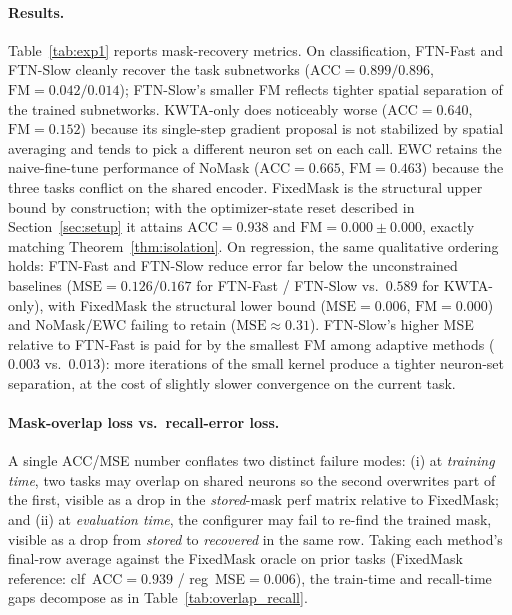 \documentclass{article}
\begin{document}
\paragraph{Results.}
Table~\ref{tab:exp1} reports mask-recovery metrics. On classification, FTN-Fast and FTN-Slow cleanly recover the task subnetworks ($\mathrm{ACC}{=}0.899 / 0.896$, $\mathrm{FM}{=}0.042 / 0.014$); FTN-Slow's smaller FM reflects tighter spatial separation of the trained subnetworks. KWTA-only does noticeably worse ($\mathrm{ACC}{=}0.640$, $\mathrm{FM}{=}0.152$) because its single-step gradient proposal is not stabilized by spatial averaging and tends to pick a different neuron set on each call. EWC retains the naive-fine-tune performance of NoMask ($\mathrm{ACC}{=}0.665$, $\mathrm{FM}{=}0.463$) because the three tasks conflict on the shared encoder. FixedMask is the structural upper bound by construction; with the optimizer-state reset described in Section~\ref{sec:setup} it attains $\mathrm{ACC}{=}0.938$ and $\mathrm{FM}{=}0.000\pm0.000$, exactly matching Theorem~\ref{thm:isolation}. On regression, the same qualitative ordering holds: FTN-Fast and FTN-Slow reduce error far below the unconstrained baselines ($\mathrm{MSE}{=}0.126 / 0.167$ for FTN-Fast / FTN-Slow vs.\ $0.589$ for KWTA-only), with FixedMask the structural lower bound ($\mathrm{MSE}{=}0.006$, $\mathrm{FM}{=}0.000$) and NoMask/EWC failing to retain ($\mathrm{MSE}{\approx}0.31$). FTN-Slow's higher MSE relative to FTN-Fast is paid for by the smallest FM among adaptive methods ($0.003$ vs.\ $0.013$): more iterations of the small kernel produce a tighter neuron-set separation, at the cost of slightly slower convergence on the current task.



\paragraph{Mask-overlap loss vs.\ recall-error loss.}
A single ACC/MSE number conflates two distinct failure modes: (i) at \emph{training time}, two tasks may overlap on shared neurons so the second overwrites part of the first, visible as a drop in the \emph{stored}-mask perf matrix relative to FixedMask; and (ii) at \emph{evaluation time}, the configurer may fail to re-find the trained mask, visible as a drop from \emph{stored} to \emph{recovered} in the same row. Taking each method's final-row average against the FixedMask oracle on prior tasks (FixedMask reference: clf~ACC$=0.939$ / reg~MSE$=0.006$), the train-time and recall-time gaps decompose as in Table~\ref{tab:overlap_recall}.
\end{document}
